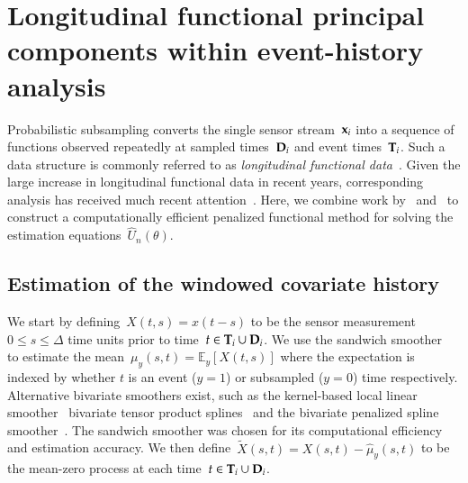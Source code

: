 \documentclass[11pt]{amsart}
\def\E{\mathcal{E}}
\def\E{\mathbb{E}}
\def\bfx{{\bf x}}
\def\bfT{{\bf T}}
\def\bfD{{\bf D}}
\begin{document}
\section{Longitudinal functional principal components within
  event-history analysis}

Probabilistic subsampling converts the single sensor stream~$\bfx_i$ into a sequence of functions observed repeatedly at sampled times~$\bfD_i$ and event times~$\bfT_i$. Such a data structure is commonly referred to as \emph{longitudinal functional data}~\citep{Xiao2013, GoldSmith2015}. Given the large increase in longitudinal functional data in recent years, corresponding analysis has received much recent attention~\citep{Morris2003, MorrisCarroll2006, Baladandayuthapani2008, Di2009, Greven2010, Staicu2010, ChenMuller2012, LiGuan2014}. Here, we combine work by~\cite{Park2018} and~\cite{Goldsmith2011} to construct a computationally efficient penalized functional method for solving the estimation equations~$\hat U_n (\theta)$.

\subsection{Estimation of the windowed covariate history}

We start by defining~$X(t,s) = x(t-s)$ to be the sensor measurement~$0 \leq s \leq \Delta$ time units prior to time~$t \in \bfT_i \cup \bfD_i$. We use the sandwich smoother~\citep{Xiao2013} to estimate the mean~$\mu_y(s,t) = \E_y [ X(t,s)]$ where the expectation is indexed by whether $t$ is an event ($y=1$) or subsampled ($y=0$) time respectively. Alternative bivariate smoothers exist, such as the kernel-based local linear smoother~\citep{Hastie2009} bivariate tensor product splines~\citep{Wood2006} and the bivariate penalized spline smoother~\citep{MarxEilers2005}. The sandwich smoother was chosen for its computational efficiency and estimation accuracy. We then define~$\tilde X(s,t) = X(s,t) - \hat \mu_y(s,t)$ to be the mean-zero process at each time~$t \in \bfT_i \cup \bfD_i$.
\end{document}
